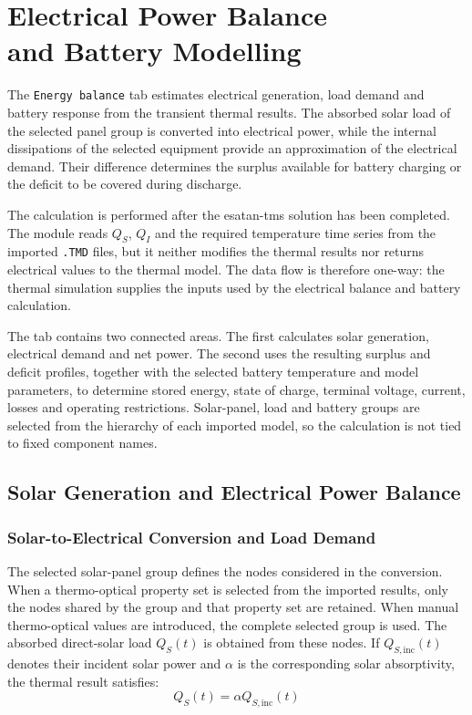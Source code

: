 \chapter[Electrical Power Balance and Battery Modelling]
{Electrical Power Balance\\and Battery Modelling}
\label{ch:electrical_battery_analysis}

The \texttt{Energy balance} tab estimates electrical generation, load demand
and battery response from the transient thermal results. The absorbed solar
load of the selected panel group is converted into electrical power, while the
internal dissipations of the selected equipment provide an approximation of
the electrical demand. Their difference determines the surplus available for
battery charging or the deficit to be covered during discharge.

The calculation is performed after the \acrshort{esatan-tms} solution has
been completed. The module reads $Q_S$, $Q_I$ and the required temperature
time series from the imported \texttt{.TMD} files, but it neither modifies the
thermal results nor returns electrical values to the thermal model. The data
flow is therefore one-way: the thermal simulation supplies the inputs used by
the electrical balance and battery calculation.

The tab contains two connected areas. The first calculates solar generation,
electrical demand and net power. The second uses the resulting surplus and
deficit profiles, together with the selected battery temperature and model
parameters, to determine stored energy, state of charge, terminal voltage,
current, losses and operating restrictions. Solar-panel, load and battery
groups are selected from the hierarchy of each imported model, so the
calculation is not tied to fixed component names.


\section{Solar Generation and Electrical Power Balance}
\label{sec:solar_electrical_balance}

\subsection{Solar-to-Electrical Conversion and Load Demand}
\label{subsec:solar_conversion_load_demand}

The selected solar-panel group defines the nodes considered in the conversion.
When a thermo-optical property set is selected from the imported results, only
the nodes shared by the group and that property set are retained.
When manual thermo-optical values are introduced, the complete selected group is used. 
The absorbed direct-solar load $Q_S(t)$ is obtained from these nodes. If $Q_{S,\mathrm{inc}}(t)$
denotes their incident solar power and $\alpha$ is the corresponding solar
absorptivity, the thermal result satisfies:
\begin{equation}
    Q_S(t)=\alpha Q_{S,\mathrm{inc}}(t)
    \label{eq:solar_absorbed_power_ch8}
\end{equation}

